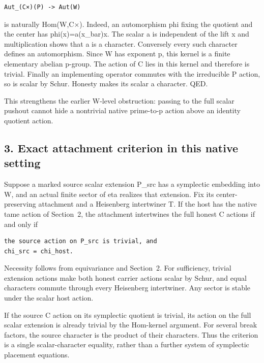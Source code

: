 \begin{Verbatim}[fontsize=\small,breaklines=true,breakanywhere=true]
Aut_(C×)(P) -> Aut(W)
\end{Verbatim}

is naturally Hom(W,C×). Indeed, an automorphism phi fixing the quotient
and the center has phi(x)=a(x\_bar)x. The scalar a is independent of the
lift x and multiplication shows that a is a character. Conversely every
such character defines an automorphism. Since W has exponent p, this
kernel is a finite elementary abelian p-group. The action of C lies in
this kernel and therefore is trivial. Finally an implementing operator
commutes with the irreducible P action, so is scalar by Schur. Honesty
makes its scalar a character. QED.

This strengthens the earlier W-level obstruction: passing to the full
scalar pushout cannot hide a nontrivial native prime-to-p action above
an identity quotient action.

\hypertarget{stabilizer_contract-exact-attachment-criterion-in-this-native-setting}{%
\subsection{3. Exact attachment criterion in this native
setting}\label{stabilizer_contract-exact-attachment-criterion-in-this-native-setting}}

Suppose a marked source scalar extension P\_src has a symplectic
embedding into W, and an actual finite sector of eta realizes that
extension. Fix its center-preserving attachment and a Heisenberg
intertwiner T. If the host has the native tame action of Section~2, the
attachment intertwines the full honest C actions if and only if

\begin{Verbatim}[fontsize=\small,breaklines=true,breakanywhere=true]
the source action on P_src is trivial, and
chi_src = chi_host.
\end{Verbatim}

Necessity follows from equivariance and Section~2. For sufficiency,
trivial extension actions make both honest carrier actions scalar by
Schur, and equal characters commute through every Heisenberg
intertwiner. Any sector is stable under the scalar host action.

If the source C action on its symplectic quotient is trivial, its action
on the full scalar extension is already trivial by the Hom-kernel
argument. For several break factors, the source character is the product
of their characters. Thus the criterion is a single scalar-character
equality, rather than a further system of symplectic placement
equations.

